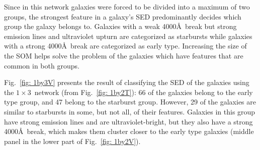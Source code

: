             Since in this network galaxies were forced to be divided into a maximum of two groups, the strongest feature in a galaxy's SED predominantly decides which group the galaxy belongs to.
            Galaxies with a weak 4000\AA~break but strong emission lines and ultraviolet upturn are categorized as starbursts while galaxies with a strong 4000\AA~break are categorized as early type.
            Increasing the size of the SOM helps solve the problem of the galaxies which have features that are common in both groups.
            
            Fig.~\ref{fig: 1by3V} presents the result of classifying the SED of the galaxies using the $1\times3$~network (from Fig.~\ref{fig: 1by2T}): 66 of the galaxies belong to the early type group, and 47 belong to the starburst group. 
            However, 29 of the galaxies are similar to starbursts in some, but not all, of their features. 
            Galaxies in this group have strong emission lines and are ultraviolet-bright, but they also have a strong 4000\AA~break, which makes them cluster closer to the early type galaxies (middle panel in the lower part of Fig.~\ref{fig: 1by2V}).

